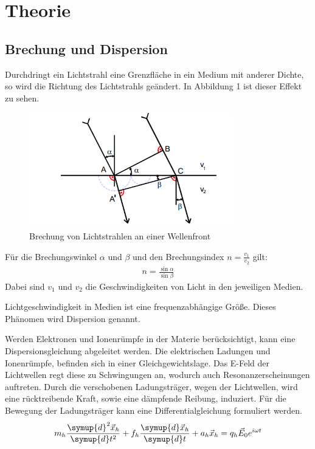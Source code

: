 \section{Theorie}
\label{sec:Theorie}

\subsection{Brechung und Dispersion}
Durchdringt ein Lichtstrahl eine Grenzfläche in ein Medium mit anderer Dichte, so wird die Richtung des Lichtstrahls geändert. In Abbildung 1
ist dieser Effekt zu sehen.

\begin{figure}[H]
  \centering
  \includegraphics[height=5cm]{wellenfront.PNG}
  \caption{Brechung von Lichtstrahlen an einer Wellenfront \cite{sample}}
  \label{fig:biegungbild1}
\end{figure}

Für die Brechungswinkel $\alpha$ und $\beta$ und den Brechungsindex $n = \frac{v_1}{v_2}$ gilt:
\begin{align}
  n = \frac{\sin{\alpha}}{\sin{\beta}}
\end{align}
 Dabei sind $v_1$ und $v_2$ die Geschwindigkeiten von Licht in den jeweiligen Medien.

Lichtgeschwindigkeit in Medien ist eine frequenzabhängige Größe. Dieses Phänomen wird Dispersion genannt.

Werden Elektronen und Ionenrümpfe in der Materie berücksichtigt, kann eine Dispersionsgleichung abgeleitet werden. Die
elektrischen Ladungen und Ionenrümpfe, befinden sich in einer Gleichgewichtslage. Das E-Feld der Lichtwellen regt diese
zu Schwingungen an, wodurch auch Resonanzerscheinungen auftreten. Durch die verschobenen Ladungsträger, wegen der Lichtwellen, wird
eine rücktreibende Kraft, sowie eine dämpfende Reibung, induziert. Für die Bewegung der Ladungsträger kann eine Differentialgleichung
formuliert werden.
\begin{align}
  m_h \frac{\symup{d}^2 \vec{x}_h}{\symup{d}t^2} + f_h \frac{\symup{d} \vec{x}_h}{\symup{d}t} + a_h \vec{x}_h = q_h \vec{E}_0 e^{i\omega t}
\end{align}

